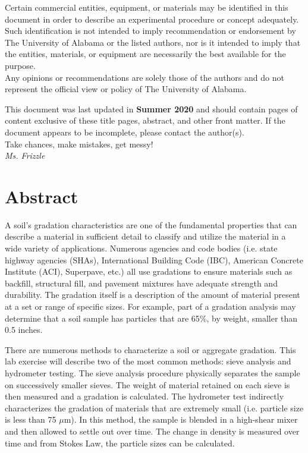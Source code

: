 \documentclass[12pt]{article}
\newcommand{\LastUpdate}{Summer 2020}
\begin{document}
\begin{titlepage}
\begin{center}
\normalsize 
Certain commercial entities, equipment, or materials may be identified in this document in order to describe an experimental procedure or concept adequately. Such identification is not intended to imply recommendation or endorsement by The University of Alabama or the listed authors, nor is it intended to imply that the entities, materials, or equipment are necessarily the best available for the purpose.\\
\vfill
Any opinions or recommendations are solely those of the authors and do not represent the official view or policy of The University of Alabama.
\end{center}
\begin{flushright}
\vfill
\normalsize 
This document was last updated in \textbf{\LastUpdate} and should contain \textbf{\pageref{LastPage}} pages of content exclusive of these title pages, abstract, and other front matter. If the document appears to be incomplete, please contact the author(s).\\
\vfill
Take chances, make mistakes, get messy!\\
\textit{Ms. Frizzle}
\end{flushright}
\end{titlepage}
\section*{Abstract}
\normalsize A soil's gradation characteristics are one of the fundamental properties that can describe a material in sufficient detail to classify and utilize the material in a wide variety of applications. Numerous agencies and code bodies (i.e. state highway agencies (SHAs), International Building Code (IBC), American Concrete Institute (ACI), Superpave, etc.) all use gradations to ensure materials such as backfill, structural fill, and pavement mixtures have adequate strength and durability. The gradation itself is a description of the amount of material present at a set or range of specific sizes. For example, part of a gradation analysis may determine that a soil sample has particles that are 65\%, by weight, smaller than 0.5 inches.

There are numerous methods to characterize a soil or aggregate gradation. This lab exercise will describe two of the most common methods: sieve analysis and hydrometer testing. The sieve analysis procedure physically separates the sample on successively smaller sieves. The weight of material retained on each sieve is then measured and a gradation is calculated. The hydrometer test indirectly characterizes the gradation of materials that are extremely small (i.e. particle size is less than 75 $\mu$m). In this method, the sample is blended in a high-shear mixer and then allowed to settle out over time. The change in density is measured over time and from Stokes Law, the particle sizes can be calculated.\\
\end{document}

